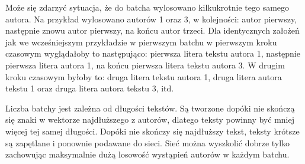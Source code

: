 Może się zdarzyć sytuacja, że do batcha wylosowano kilkukrotnie tego samego autora. Na przykład wylosowano
autorów 1 oraz 3, w kolejności: autor pierwszy, następnie znowu autor pierwszy, na końcu autor trzeci.
Dla identycznych założeń jak we wcześniejszym przykładzie w pierwszym batchu w pierwszym kroku czasowym wyglądałoby to
 następująco: pierwsza litera tekstu autora 1, następnie pierwsza litera autora 1,
na końcu pierwsza litera tekstu autora 3. W drugim kroku czasowym byłoby to:
druga litera tekstu autora 1, druga litera autora tekstu 1 oraz druga litera autora tekstu 3, itd.

Liczba batchy jest zależna od długości tekstów. Są tworzone dopóki nie skończą się znaki w wektorze
najdłuższego z autorów, dlatego teksty powinny być mniej więcej tej samej długości. Dopóki nie skończy się 
najdłuższy tekst, teksty krótsze są zapętlane i ponownie podawane do sieci.  Sieć można
wyszkolić dobrze tylko zachowując maksymalnie dużą losowość wystąpień autorów w każdym batchu.
